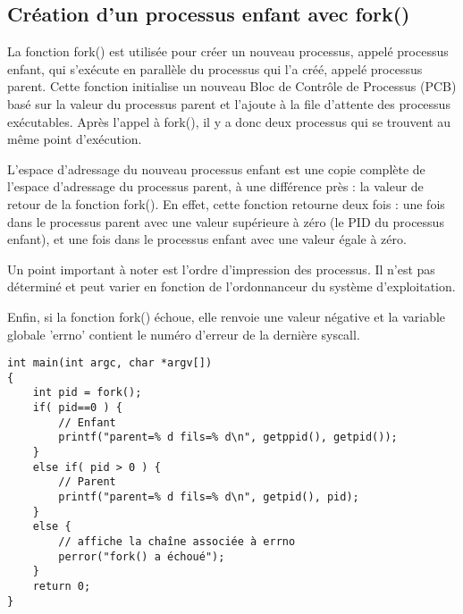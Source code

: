 \documentclass[12pt]{article}
\begin{document}
\subsection{Création d'un processus enfant avec fork()}
La fonction fork() est utilisée pour créer un nouveau processus, appelé processus enfant, qui s'exécute en parallèle du processus qui l'a créé, appelé processus parent. Cette fonction initialise un nouveau Bloc de Contrôle de Processus (PCB) basé sur la valeur du processus parent et l'ajoute à la file d'attente des processus exécutables. Après l'appel à fork(), il y a donc deux processus qui se trouvent au même point d'exécution.\par
L'espace d'adressage du nouveau processus enfant est une copie complète de l'espace d'adressage du processus parent, à une différence près : la valeur de retour de la fonction fork(). En effet, cette fonction retourne deux fois : une fois dans le processus parent avec une valeur supérieure à zéro (le PID du processus enfant), et une fois dans le processus enfant avec une valeur égale à zéro.\par
Un point important à noter est l'ordre d'impression des processus. Il n'est pas déterminé et peut varier en fonction de l'ordonnanceur du système d'exploitation.\par
Enfin, si la fonction fork() échoue, elle renvoie une valeur négative et la variable globale 'errno' contient le numéro d'erreur de la dernière syscall.
\begin{lstlisting}
int main(int argc, char *argv[])
{
    int pid = fork();
    if( pid==0 ) {
        // Enfant
        printf("parent=% d fils=% d\n", getppid(), getpid());
    }
    else if( pid > 0 ) {
        // Parent
        printf("parent=% d fils=% d\n", getpid(), pid);
    }
    else {
        // affiche la chaîne associée à errno
        perror("fork() a échoué");
    }
    return 0;
}
\end{lstlisting}
\end{document}
